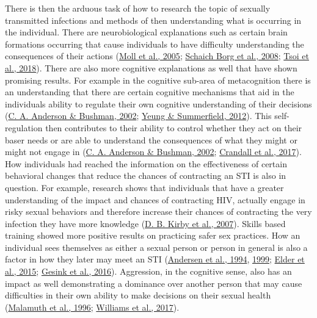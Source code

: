 \documentclass[
  donotrepeattitle,doc, 12pt, a4paper,floatsintext]{apa7}
\begin{document}
There is then the arduous task of how to research the topic of sexually transmitted infections and methods of then understanding what is occurring in the individual. There are neurobiological explanations such as certain brain formations occurring that cause individuals to have difficulty understanding the consequences of their actions (\protect\hyperlink{ref-moll2005}{Moll et al., 2005}; \protect\hyperlink{ref-schaichborg2008}{Schaich Borg et al., 2008}; \protect\hyperlink{ref-tsoi2018}{Tsoi et al., 2018}). There are also more cognitive explanations as well that have shown promising results. For example in the cognitive sub-area of metacognition there is an understanding that there are certain cognitive mechanisms that aid in the individuals ability to regulate their own cognitive understanding of their decisions (\protect\hyperlink{ref-anderson2002}{C. A. Anderson \& Bushman, 2002}; \protect\hyperlink{ref-yeung2012}{Yeung \& Summerfield, 2012}). This self-regulation then contributes to their ability to control whether they act on their baser needs or are able to understand the consequences of what they might or might not engage in (\protect\hyperlink{ref-anderson2002}{C. A. Anderson \& Bushman, 2002}; \protect\hyperlink{ref-crandall2017}{Crandall et al., 2017}). How individuals had reached the information on the effectiveness of certain behavioral changes that reduce the chances of contracting an STI is also in question. For example, research shows that individuals that have a greater understanding of the impact and chances of contracting HIV, actually engage in risky sexual behaviors and therefore increase their chances of contracting the very infection they have more knowledge (\protect\hyperlink{ref-kirby2007}{D. B. Kirby et al., 2007}). Skills based training showed more positive results on practicing safer sex practices. How an individual sees themselves as either a sexual person or person in general is also a factor in how they later may meet an STI (\protect\hyperlink{ref-andersen1994}{Andersen et al., 1994}, \protect\hyperlink{ref-andersen1999}{1999}; \protect\hyperlink{ref-elder2015a}{Elder et al., 2015}; \protect\hyperlink{ref-gesink2016}{Gesink et al., 2016}). Aggression, in the cognitive sense, also has an impact as well demonstrating a dominance over another person that may cause difficulties in their own ability to make decisions on their sexual health (\protect\hyperlink{ref-malamuth1996}{Malamuth et al., 1996}; \protect\hyperlink{ref-williams2017}{Williams et al., 2017}).
\end{document}
